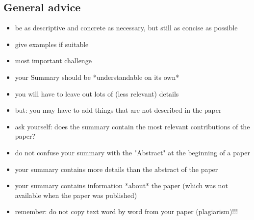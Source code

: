 \subsection{General advice}
\begin{itemize}
 \item be as descriptive and concrete as necessary, but still as concise as possible
 \item give examples if suitable

 \item most important challenge
   \item your Summary should be *understandable on its own*
     \item you will have to leave out lots of (less relevant) details
     \item but: you may have to add things that are not described in the paper

  \item ask yourself: does the summary contain the most relevant contributions of the paper?

 \item do not confuse your summary with the "Abstract" at the beginning of a paper
   \item your summary contains more details than the abstract of the paper
   \item your summary contains information *about* the paper (which was not available when the paper was published)

  \item remember: do not copy text word by word from your paper (plagiarism)!!!

\end{itemize}